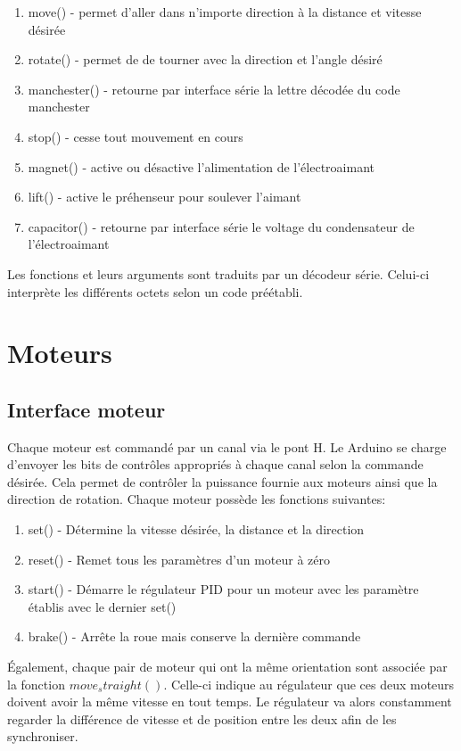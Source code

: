 \begin{enumerate}

\item move() - permet d’aller dans n’importe direction à la distance et vitesse désirée
\item rotate() -  permet de de tourner avec la direction et l’angle désiré
\item manchester() - retourne par interface série la lettre décodée du code manchester
\item stop() - cesse tout mouvement en cours
\item magnet() - active ou désactive l’alimentation de l’électroaimant
\item lift() - active le préhenseur pour soulever l’aimant
\item capacitor() - retourne par interface série le voltage du condensateur de l’électroaimant
\end{enumerate}

Les fonctions et leurs arguments sont traduits par un décodeur série. Celui-ci interprète les différents octets selon un code préétabli.

\section{Moteurs}

\subsection{Interface moteur}

Chaque moteur est commandé par un canal via le pont H.
Le Arduino se charge d’envoyer les bits de contrôles appropriés à chaque canal selon la commande désirée. Cela permet de contrôler la puissance fournie aux moteurs ainsi
que la direction de rotation. Chaque moteur possède les fonctions suivantes:

\begin{enumerate}
\item set() - Détermine la vitesse désirée, la distance et la direction
\item reset() - Remet tous les paramètres d’un moteur à zéro
\item start() - Démarre le régulateur PID pour un moteur avec les paramètre établis avec le dernier set()
\item brake() - Arrête la roue mais conserve la dernière commande
\end{enumerate}

Également, chaque pair de moteur qui ont la même orientation sont associée par la fonction $move_straight()$. Celle-ci indique au régulateur que ces deux moteurs doivent avoir la même vitesse en tout temps.
Le régulateur va alors constamment regarder la différence de vitesse et de position entre les deux afin de les synchroniser.

